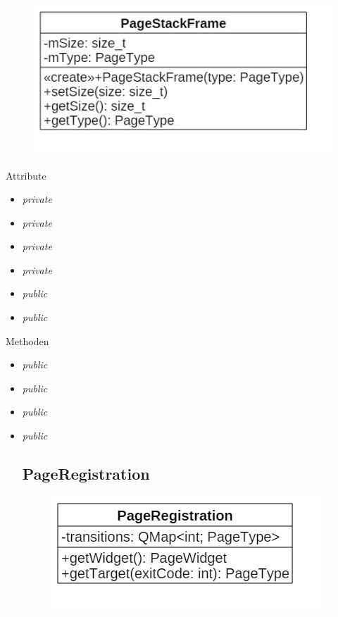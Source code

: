 \begin{itemize}
\begin{itemize}
\begin{itemize}
\begin{itemize}
\begin{figure}[H]
\centering
\includegraphics[scale=0.5]{img/Klassendiagramm/Klassen/Controller/PageStackFrame}
\label{fig:pageStackFrame}
\end{figure}

Attribute
\begin{itemize}
	\item\textit{private }
	
	\item\textit{private }
	
	\item\textit{private }
	
	\item\textit{private }
	
	\item\textit{public }  
	
	\item\textit{public }
	
\end{itemize}

Methoden
\begin{itemize}
	\item\textit{public }
	
	\item\textit{public }
	
	\item\textit{public }
	
	\item\textit{public }

\subsection*{PageRegistration}

\begin{figure}[H]
\centering
\includegraphics[scale=0.5]{img/Klassendiagramm/Klassen/Controller/PageRegistration}
\label{fig:pageRegistration}
\end{figure}


\end{itemize}
\end{itemize}
\end{itemize}
\end{itemize}
\end{itemize}
